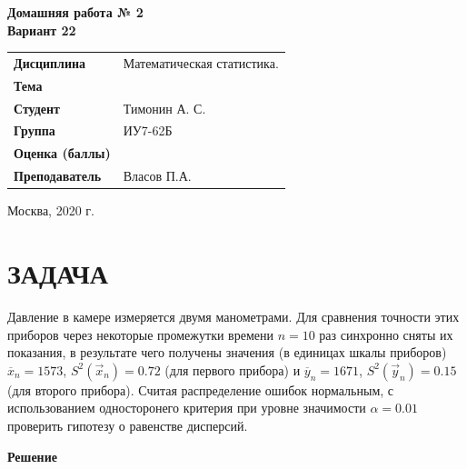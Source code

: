 \documentclass[12pt, a4paper]{report}
\begin{document}
\begin{titlepage}
  	\vspace{2cm}
  	
  	\begin{center}
  		\textbf{Домашняя работа № 2} \\
  		\vspace{0.5cm}
  		\textbf{Вариант 22}
  	\end{center}
  	
  	\vspace{4cm}
  	
  	\begin{flushleft}
  		\begin{tabular}{ll}
  			\textbf{Дисциплина} & Математическая статистика. \\
  			\textbf{Тема} & \\
  			\textbf{Студент} & Тимонин А. С. \\
  			\textbf{Группа} & ИУ7-62Б \\
  			\textbf{Оценка (баллы)} & \\
  			\textbf{Преподаватель} & Власов П.А. \\
  		\end{tabular}
  	\end{flushleft}
  	
  	\vspace{6cm}
  	
  	\begin{center}
  		Москва, 2020 г.
  	\end{center}
  	
  	
  \end{titlepage}
  
	
	\section{ЗАДАЧА}
	
	\hspace{1cm} Давление в камере измеряется двумя манометрами. Для сравнения точности этих приборов через некоторые промежутки времени $n = 10$ раз синхронно сняты их показания, в результате чего получены значения (в единицах шкалы приборов) $\overline{x}_n = 1573$, $S^2(\vec{x}_n) = 0.72$ (для первого прибора) и $\overline{y}_n = 1671$, $S^2(\vec{y}_n) = 0.15$ (для второго прибора). Считая распределение ошибок нормальным, с использованием односторонего критерия при уровне значимости $\alpha = 0.01$ проверить гипотезу о равенстве дисперсий.
	
	
	\vspace{0.7cm}\textbf{Решение} 
	
\end{document}
